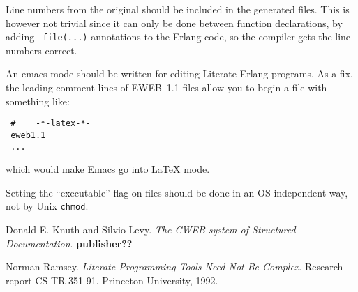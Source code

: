 Line numbers from the original should be included in the generated
files. This is however not trivial since it can only be done between
function declarations, by adding \verb+-file(...)+ annotations to the
Erlang code, so the compiler gets the line numbers correct.

An emacs-mode should be written for editing Literate Erlang programs. As
a fix, the leading comment lines of EWEB~1.1 files allow you to begin a
file with something like:
\begin{verbatim}
 #    -*-latex-*-
 eweb1.1
 ...
\end{verbatim}
which would make Emacs go into \LaTeX{} mode.

Setting the ``executable'' flag on files should be done in an
OS-independent way, not by Unix \verb+chmod+.

\begin{thebibliography}{99}

      Donald  E. Knuth and Silvio   Levy. {\sl The CWEB
system of Structured Documentation}. {\bf publisher??}

     Norman  Ramsey.  {\sl Literate-Programming   Tools
Need  Not Be   Complex}.  Research   report  CS-TR-351-91.   Princeton
University, 1992.

\end{thebibliography}


